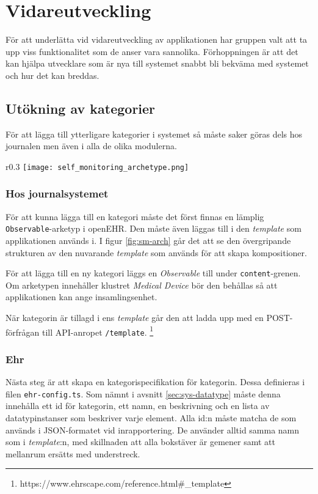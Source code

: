 \documentclass[techdoc/techdoc.tex]{subfiles}
\begin{document}
\section{Vidareutveckling} \label{sec:5_develop}
För att underlätta vid vidareutveckling av applikationen har gruppen valt att
ta upp viss funktionalitet som de anser vara sannolika. Förhoppningen är att det
kan hjälpa utvecklare som är nya till systemet snabbt bli bekväma med systemet
och hur det kan breddas.

\subsection{Utökning av kategorier}
För att lägga till ytterligare kategorier i systemet så måste saker göras dels
hos journalen men även i alla de olika modulerna.

\begin{wrapfigure}{r}{0.3\linewidth}
    \vspace*{-5mm}
    \texttt{[image: self\_monitoring\_archetype.png]}
    \vspace*{-5mm}
    \caption{Nuvarande template för inrapportering.}
    \label{fig:sm-arch}
    \vspace*{-17mm}
\end{wrapfigure}

\subsubsection{Hos journalsystemet}
För att kunna lägga till en kategori måste det först finnas en lämplig
\texttt{Observable}-arketyp i openEHR. Den måste även läggas till i den
\emph{template} som applikationen används i. I figur \ref{fig:sm-arch} går det
att se den övergripande strukturen av den nuvarande \emph{template} som används
för att skapa kompositioner.

För att lägga till en ny kategori läggs en \emph{Observable} till under
\texttt{content}-grenen. Om arketypen innehåller klustret \emph{Medical Device}
bör den behållas så att applikationen kan ange insamlingsenhet.

När kategorin är tillagd i ens \emph{template} går den att ladda upp med en
POST-förfrågan till API-anropet \texttt{/template}.
\footnote{https://www.ehrscape.com/reference.html\#\_template}

\subsubsection{Ehr}
Nästa steg är att skapa en kategorispecifikation för kategorin. Dessa
definieras i filen \texttt{ehr-config.ts}. Som nämnt i avsnitt
\ref{sec:sys-datatype} måste denna innehålla ett id för kategorin, ett namn, en
beskrivning och en lista av datatypinstanser som beskriver varje element. Alla
id:n måste matcha de som används i JSON-formatet vid inrapportering. De
använder alltid samma namn som i \emph{template}:n, med skillnaden att alla
bokstäver är gemener samt att mellanrum ersätts med understreck.
\end{document}
